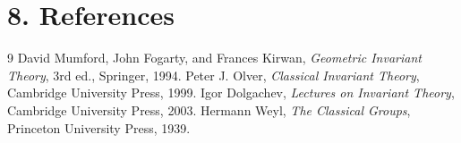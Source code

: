 \section*{8. References}

\begin{thebibliography}{9}
 David Mumford, John Fogarty, and Frances Kirwan, \emph{Geometric Invariant Theory}, 3rd ed., Springer, 1994.
 Peter J. Olver, \emph{Classical Invariant Theory}, Cambridge University Press, 1999.
 Igor Dolgachev, \emph{Lectures on Invariant Theory}, Cambridge University Press, 2003.
 Hermann Weyl, \emph{The Classical Groups}, Princeton University Press, 1939.
\end{thebibliography}
